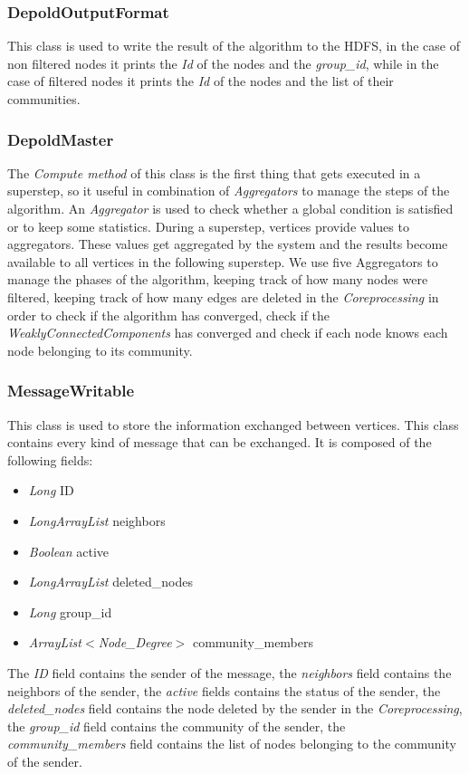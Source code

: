 \documentclass[12pt]{article}
\begin{document}
\subsubsection{DepoldOutputFormat}
This class is used to write the result of the algorithm to the HDFS, in the case of non filtered nodes it prints the \emph{Id} of the nodes and the \emph{group\_id}, while in the case of filtered nodes it prints the \emph{Id} of the nodes and the list of their communities.
\subsubsection{DepoldMaster}
The \emph{Compute method} of this class is the first thing that gets executed in a superstep, so it useful in combination of \emph{Aggregators} to manage the steps of the algorithm. An \emph{Aggregator} is used to check whether a global condition is satisfied or to keep some statistics. During a superstep, vertices provide values to aggregators. These values get aggregated by the system and the results become available to all vertices in the following superstep. We use five Aggregators to manage the phases of the algorithm, keeping track of how many nodes were filtered, keeping track of how many edges are deleted in the \emph{Coreprocessing} in order to check if the algorithm has converged, check if the \emph{WeaklyConnectedComponents} has converged and check if each node knows each node belonging to its community.
\subsubsection{MessageWritable}
This class is used to store the information exchanged between vertices. This class contains every kind of message that can be exchanged.
It is composed of the following fields:
\begin{itemize}
    \item \emph{Long} ID
    \item \emph{LongArrayList} neighbors
    \item \emph{Boolean} active
    \item \emph{LongArrayList} deleted\_nodes
    \item \emph{Long} group\_id
    \item \emph{ArrayList$<$Node\_Degree$>$} community\_members
\end{itemize}
    The \emph{ID} field contains the sender of the message, the \emph{neighbors} field contains the neighbors of the sender, the \emph{active} fields contains the status of the sender, the \emph{deleted\_nodes} field contains the node deleted by the sender in the \emph{Coreprocessing},
    the \emph{group\_id} field contains the community of the sender, the \emph{community\_members} field contains the list of nodes belonging to the community of the sender.
\end{document}
